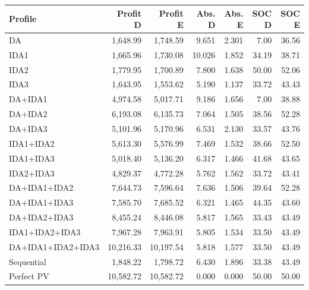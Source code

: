 \begingroup\small
\begin{longtable}{lrrrrrr}
\toprule
Profile & Profit D & Profit E & Abs. D & Abs. E & SOC D & SOC E\\
\midrule\endhead
DA & 1,648.99 & 1,748.59 & 9.651 & 2.301 & 7.00 & 36.56\\
IDA1 & 1,665.96 & 1,730.08 & 10.026 & 1.852 & 34.19 & 38.71\\
IDA2 & 1,779.95 & 1,700.89 & 7.800 & 1.638 & 50.00 & 52.06\\
IDA3 & 1,643.95 & 1,553.62 & 5.190 & 1.137 & 33.72 & 43.43\\
DA+IDA1 & 4,974.58 & 5,017.71 & 9.186 & 1.656 & 7.00 & 38.88\\
DA+IDA2 & 6,193.08 & 6,135.73 & 7.064 & 1.505 & 38.56 & 52.28\\
DA+IDA3 & 5,101.96 & 5,170.96 & 6.531 & 2.130 & 33.57 & 43.76\\
IDA1+IDA2 & 5,613.30 & 5,576.99 & 7.469 & 1.532 & 38.66 & 52.50\\
IDA1+IDA3 & 5,018.40 & 5,136.20 & 6.317 & 1.466 & 41.68 & 43.65\\
IDA2+IDA3 & 4,829.37 & 4,772.28 & 5.762 & 1.562 & 33.72 & 43.41\\
DA+IDA1+IDA2 & 7,644.73 & 7,596.64 & 7.636 & 1.506 & 39.64 & 52.28\\
DA+IDA1+IDA3 & 7,585.70 & 7,685.52 & 6.321 & 1.465 & 44.35 & 43.60\\
DA+IDA2+IDA3 & 8,455.24 & 8,446.08 & 5.817 & 1.565 & 33.43 & 43.49\\
IDA1+IDA2+IDA3 & 7,967.28 & 7,963.91 & 5.805 & 1.534 & 33.50 & 43.49\\
DA+IDA1+IDA2+IDA3 & 10,216.33 & 10,197.54 & 5.818 & 1.577 & 33.50 & 43.49\\
Sequential & 1,848.22 & 1,798.72 & 6.430 & 1.896 & 33.38 & 43.49\\
Perfect PV & 10,582.72 & 10,582.72 & 0.000 & 0.000 & 50.00 & 50.00\\
\bottomrule
\end{longtable}
\endgroup
